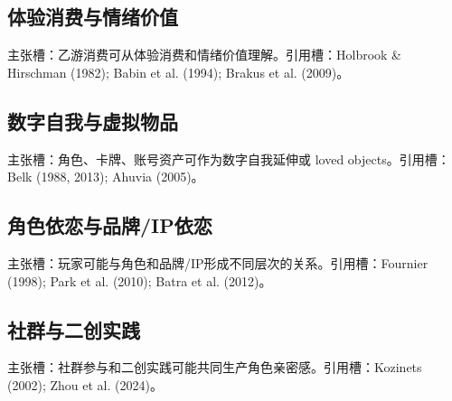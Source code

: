 \documentclass[UTF8,zihao=-4]{ctexart}
\begin{document}
\subsection{体验消费与情绪价值}
主张槽：乙游消费可从体验消费和情绪价值理解。引用槽：Holbrook \& Hirschman (1982); Babin et al. (1994); Brakus et al. (2009)。
\subsection{数字自我与虚拟物品}
主张槽：角色、卡牌、账号资产可作为数字自我延伸或 loved objects。引用槽：Belk (1988, 2013); Ahuvia (2005)。
\subsection{角色依恋与品牌/IP依恋}
主张槽：玩家可能与角色和品牌/IP形成不同层次的关系。引用槽：Fournier (1998); Park et al. (2010); Batra et al. (2012)。
\subsection{社群与二创实践}
主张槽：社群参与和二创实践可能共同生产角色亲密感。引用槽：Kozinets (2002); Zhou et al. (2024)。
\end{document}
